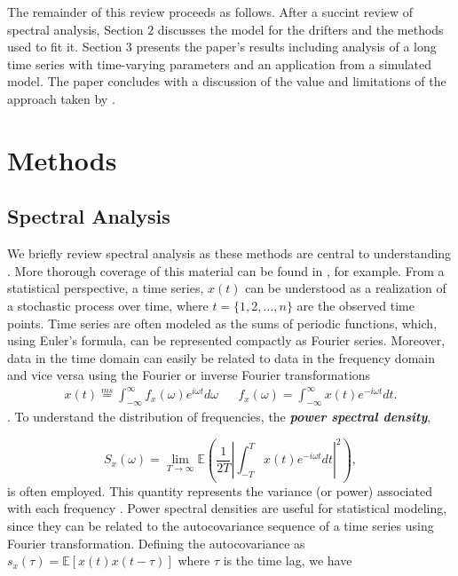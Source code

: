 \documentclass{stat572Style}
\begin{document}
\indent The remainder of this review proceeds as follows. After a succint review of spectral analysis, Section 2 discusses the model for the drifters and the methods used to fit it. Section 3 presents the paper's results including analysis of a long time series with time-varying parameters and an application from a simulated model. The paper concludes with a discussion of the value and limitations of the approach taken by \citet{Sykulski2016}. 
\section{Methods}
			

	\subsection{Spectral Analysis}
	\indent We briefly review spectral analysis as these methods are central to understanding \citet{Sykulski2016}.  More thorough coverage of this material can be found in  \citep{Percival1993}, for example. From a statistical perspective, a time series, $x(t)$ can be understood as a realization of a stochastic process over time, where  $t = \{1,2,...,n\}$ are the observed time points.  Time series are often modeled as the sums of periodic functions, which, using Euler's formula, can be represented compactly as Fourier series. Moreover, data in the time domain can easily be related to data in the frequency domain and vice versa using the Fourier or inverse Fourier transformations 	\begin{align}
x(t) \overset{ms}{=} \int_{-\infty}^{\infty} f_{x}(\omega)e^{i\omega t}d\omega && f_{x}(\omega) = \int_{-\infty}^{\infty} x(t) e^{-i \omega t }dt.
\end{align}
\citep{Percival1993}. To understand the distribution of frequencies, the \textbf{\it{power spectral density}},


\begin{equation}
S_{x}(\omega) = \underset{T \rightarrow \infty}{\lim} \mathbb{E} \left(\frac{1}{2T} \left| \int_{-T}^{T} x(t) e^{-i \omega t}dt \right|^{2} \right),
\end{equation}
is often employed. This quantity represents the variance (or power) associated with each frequency \citep{Percival1993}. Power spectral densities are useful for statistical modeling, since they can be related to the autocovariance sequence of a time series using  Fourier transformation.  Defining the autocovariance as $s_{x}(\tau) = \mathbb{E}[x(t) x(t - \tau)] $ where $\tau$ is the time lag, we have
\end{document}
